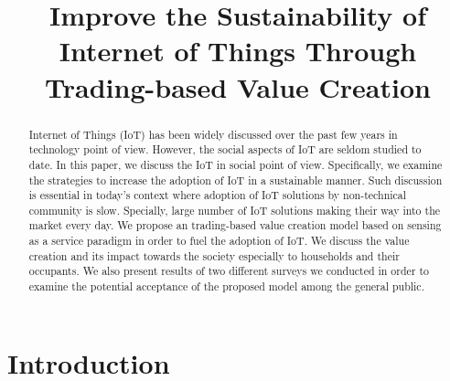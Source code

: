 \documentclass[conference]{IEEEtran}
\begin{document}
\title{Improve the Sustainability of Internet of Things Through Trading-based Value Creation }








\author{
}

















\maketitle


\begin{abstract}
Internet of Things (IoT) has been widely discussed over the past few years in technology point of view. However, the social aspects of IoT are seldom studied to date. In this paper, we discuss the IoT in social point of view. Specifically, we examine the strategies to increase the adoption of IoT in a sustainable manner. Such discussion is essential in today's context where adoption of IoT solutions by non-technical community is slow. Specially, large number of IoT solutions making their way into the market every day. We propose an trading-based value creation model based on sensing as a service paradigm in order to fuel the adoption of IoT. We discuss the value creation and its impact towards the society especially to households and their occupants. We also present results of two different surveys we conducted in order to examine the potential acceptance of the proposed model among the general public.

\end{abstract}







\IEEEpeerreviewmaketitle



\section{Introduction}
\label{sec:Introduction}
\end{document}
